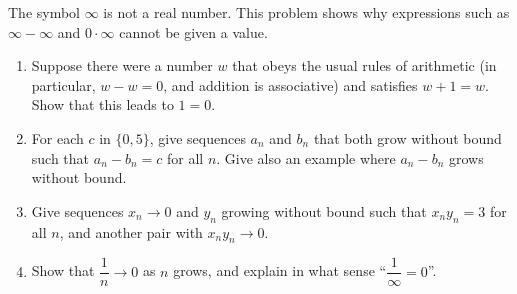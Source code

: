 The symbol $\infty$ is not a real number. This problem shows why expressions such as $\infty-\infty$ and $0\cdot\infty$ cannot be given a value.
\begin{enumerate}
\item[(a)] Suppose there were a number $w$ that obeys the usual rules of arithmetic (in particular, $w-w=0$, and addition is associative) and satisfies $w+1=w$. Show that this leads to $1=0$.
\item[(b)] For each $c$ in $\{0,5\}$, give sequences $a_n$ and $b_n$ that both grow without bound such that $a_n-b_n=c$ for all $n$. Give also an example where $a_n-b_n$ grows without bound.
\item[(c)] Give sequences $x_n\to0$ and $y_n$ growing without bound such that $x_ny_n=3$ for all $n$, and another pair with $x_ny_n\to0$.
\item[(d)] Show that $\dfrac{1}{n}\to0$ as $n$ grows, and explain in what sense ``$\dfrac{1}{\infty}=0$''.
\end{enumerate}
